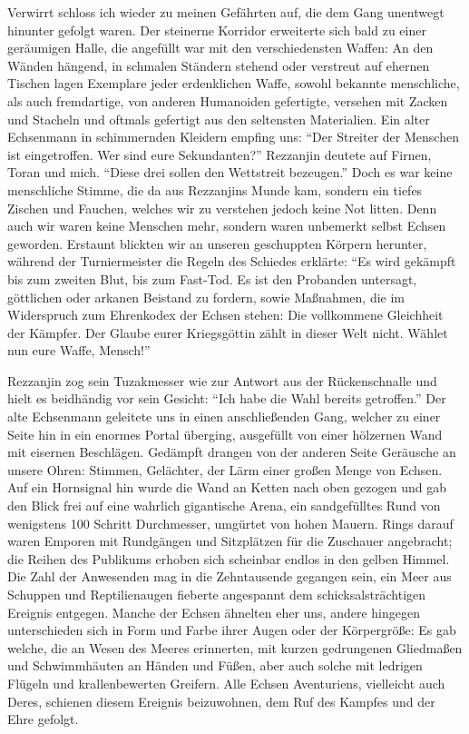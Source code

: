 Verwirrt schloss ich wieder zu meinen Gefährten auf, die dem Gang unentwegt hinunter gefolgt waren. Der steinerne Korridor erweiterte sich bald zu einer geräumigen Halle, die angefüllt war mit den verschiedensten Waffen: An den Wänden hängend, in schmalen Ständern stehend oder verstreut auf ehernen Tischen lagen Exemplare jeder erdenklichen Waffe, sowohl bekannte menschliche, als auch fremdartige, von anderen Humanoiden gefertigte, versehen mit Zacken und Stacheln und oftmals gefertigt aus den seltensten Materialien. Ein alter Echsenmann in schimmernden Kleidern empfing uns: ``Der Streiter der Menschen ist eingetroffen. Wer sind eure Sekundanten?'' Rezzanjin deutete auf Firnen, Toran und mich. ``Diese drei sollen den Wettstreit bezeugen.'' Doch es war keine menschliche Stimme, die da aus Rezzanjins Munde kam, sondern ein tiefes Zischen und Fauchen, welches wir zu verstehen jedoch keine Not litten. Denn auch wir waren keine Menschen mehr, sondern waren unbemerkt selbst Echsen geworden. Erstaunt blickten wir an unseren geschuppten Körpern herunter, während der Turniermeister die Regeln des Schiedes erklärte: ``Es wird gekämpft bis zum zweiten Blut, bis zum Fast-Tod. Es ist den Probanden untersagt, göttlichen oder arkanen Beistand zu fordern, sowie Maßnahmen, die im Widerspruch zum Ehrenkodex der Echsen stehen: Die vollkommene Gleichheit der Kämpfer. Der Glaube eurer Kriegsgöttin zählt in dieser Welt nicht. Wählet nun eure Waffe, Mensch!''

Rezzanjin zog sein Tuzakmesser wie zur Antwort aus der Rückenschnalle und hielt es beidhändig vor sein Gesicht: ``Ich habe die Wahl bereits getroffen.'' Der alte Echsenmann geleitete uns in einen anschließenden Gang, welcher zu einer Seite hin in ein enormes Portal überging, ausgefüllt von einer hölzernen Wand mit eisernen Beschlägen. Gedämpft drangen von der anderen Seite Geräusche an unsere Ohren: Stimmen, Gelächter, der Lärm einer großen Menge von Echsen. Auf ein Hornsignal hin wurde die Wand an Ketten nach oben gezogen und gab den Blick frei auf eine wahrlich gigantische Arena, ein sandgefülltes Rund von wenigstens 100 Schritt Durchmesser, umgürtet von hohen Mauern. Rings darauf waren Emporen mit Rundgängen und Sitzplätzen für die Zuschauer angebracht; die Reihen des Publikums erhoben sich scheinbar endlos in den gelben Himmel. Die Zahl der Anwesenden mag in die Zehntausende gegangen sein, ein Meer aus Schuppen und Reptilienaugen fieberte angespannt dem schicksalsträchtigen Ereignis entgegen. Manche der Echsen ähnelten eher uns, andere hingegen unterschieden sich in Form und Farbe ihrer Augen oder der Körpergröße: Es gab welche, die an Wesen des Meeres erinnerten, mit kurzen gedrungenen Gliedmaßen und Schwimmhäuten an Händen und Füßen, aber auch solche mit ledrigen Flügeln und krallenbewerten Greifern. Alle Echsen Aventuriens, vielleicht auch Deres, schienen diesem Ereignis beizuwohnen, dem Ruf des Kampfes und der Ehre gefolgt.

